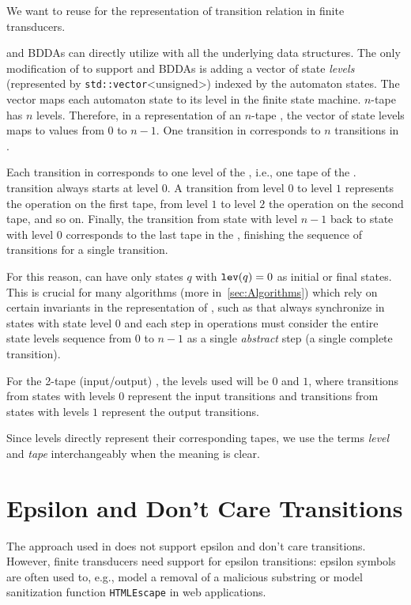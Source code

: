 We want to reuse \deltastruct for the representation of transition relation in finite transducers.

\nfts and BDDAs can directly utilize \nfaClass with all the underlying data structures.
The only modification of \nfaClass to support \nfts and BDDAs is adding a vector of state \emph{levels} (represented by \texttt{std::vector}<unsigned>) indexed by the automaton states. The vector maps each automaton state to its level in the finite state machine.
$n$-tape \nft has $n$ levels.
Therefore, in a representation of an $n$-tape \nft, the vector of state levels maps to values from $0$ to $n-1$.
One transition in \nft corresponds to $n$ transitions in \nfaClass.

Each transition in \nfaClass corresponds to one level of the \nft, i.e., one tape of the \nft.
\nft transition always starts at level $0$.
A transition from level $0$ to level $1$ represents the operation on the first \nft tape, from level $1$ to level $2$ the operation on the second \nft tape, and so on.
Finally, the transition from state with level $n-1$ back to state with level $0$ corresponds to the last tape in the \nft, finishing the sequence of \nfa transitions for a single \nft transition.

For this reason, \nfts can have only states $q$ with $\texttt{lev}(q) = 0$ as initial or final states.
This is crucial for many algorithms (more in~\ref{sec:Algorithms}) which rely on certain invariants in the representation of \nfts, such as that \nfts always synchronize in states with state level $0$ and each step in operations must consider the entire state levels sequence from $0$ to $n-1$ as a single \emph{abstract} step (a single complete \nft transition).

For the 2-tape (input/output) \nfts, the levels used will be $0$ and $1$, where transitions from states with levels $0$ represent the input transitions and transitions from states with levels $1$ represent the output transitions.

Since levels directly represent their corresponding tapes, we use the terms \emph{level} and \emph{tape} interchangeably when the meaning is clear.

\section{Epsilon and Don't Care Transitions}
\label{sec:epsilon_dont_care}
The approach used in \lash does not support epsilon and don't care transitions.
However, finite transducers need support for epsilon transitions: epsilon symbols are often used to, e.g., model a removal of a malicious substring or model sanitization function \texttt{HTMLEscape} in web applications.


